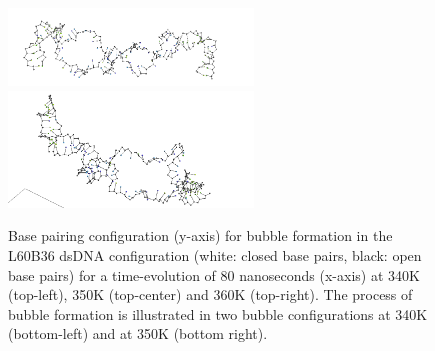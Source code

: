 \begin{figure}[hbt] \begin{minipage}{4.5cm} \end{minipage} \begin{minipage}{4.5cm}  \end{minipage}
\begin{minipage}{4cm}  \end{minipage} 
\begin{center}
\includegraphics[width=6.5cm]{images/L60B36_bubble2.png} \includegraphics[width=6.5cm]{images/L60B36_bubble1.png}
\caption{Base pairing configuration (y-axis) for bubble formation in the L60B36 dsDNA configuration (white: closed base pairs, black: open base pairs) for a time-evolution of 80 nanoseconds (x-axis) at 340K (top-left), 350K (top-center) and 360K (top-right). The process of bubble formation is illustrated in two bubble configurations at 340K (bottom-left) and at 350K (bottom right). }\label{L60B36_configs}
\end{center}
\end{figure}






